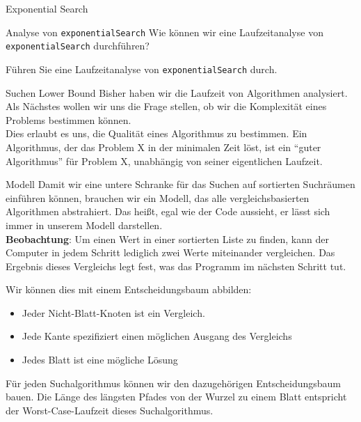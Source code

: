 \begin{frame}{Exponential Search}
    \begin{myanswer}
        
    \end{myanswer}
\end{frame}

\begin{frame}{Analyse von \texttt{exponentialSearch}}
    Wie können wir eine Laufzeitanalyse von \texttt{exponentialSearch} durchführen?\pause 
    \begin{myexercise}\label{myexercise:exponentialSearchAnalysis} 
        Führen Sie eine Laufzeitanalyse von \texttt{exponentialSearch} durch. 
    \end{myexercise}
\end{frame}

\begin{frame}{Suchen Lower Bound}
    Bisher haben wir die Laufzeit von Algorithmen analysiert. Als Nächstes wollen wir uns die Frage stellen, ob wir die Komplexität eines Problems bestimmen können.\\ 
    Dies erlaubt es uns, die Qualität eines Algorithmus zu bestimmen. Ein Algorithmus, der das Problem X in der minimalen Zeit löst, ist ein \enquote{guter Algorithmus} für Problem X, unabhängig von seiner eigentlichen Laufzeit. 
\end{frame}

\begin{frame}{Modell}
    Damit wir eine untere Schranke für das Suchen auf sortierten Suchräumen einführen können, brauchen wir ein Modell, das alle vergleichsbasierten Algorithmen abstrahiert. Das heißt, egal wie der Code aussieht, er lässt sich immer in unserem Modell darstellen.\\ 

    \textbf{Beobachtung}: Um einen Wert in einer sortierten Liste zu finden, kann der Computer in jedem Schritt lediglich zwei Werte miteinander vergleichen. Das Ergebnis dieses Vergleichs legt fest, was das Programm im nächsten Schritt tut.\\\pause 

    Wir können dies mit einem Entscheidungsbaum abbilden:
    \begin{itemize}
        \item Jeder Nicht-Blatt-Knoten ist ein Vergleich. 
        \item Jede Kante spezifiziert einen möglichen Ausgang des Vergleichs
        \item Jedes Blatt ist eine mögliche Lösung
    \end{itemize}

    Für jeden Suchalgorithmus können wir den dazugehörigen Entscheidungsbaum bauen. Die Länge des längsten Pfades von der Wurzel zu einem Blatt entspricht der Worst-Case-Laufzeit dieses Suchalgorithmus.
\end{frame}


